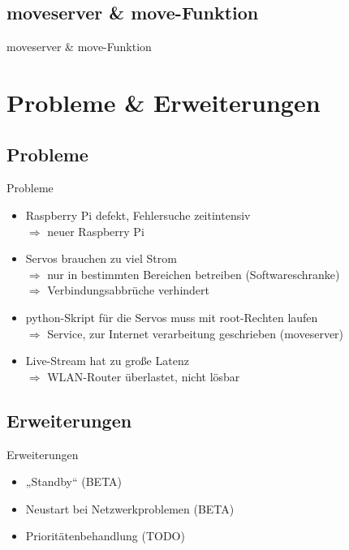 \documentclass{beamer}
\begin{document}
\subsection{moveserver \& move-Funktion}
\begin{frame}{moveserver \& move-Funktion}
\end{frame}


\section{Probleme \& Erweiterungen}%
\subsection{Probleme}
\begin{frame}{Probleme}
\begin{itemize}
	\item<1-> Raspberry Pi defekt, Fehlersuche zeitintensiv\\
		$\Rightarrow$ neuer Raspberry Pi
	\item<2-> Servos brauchen zu viel Strom\\
		$\Rightarrow$ nur in bestimmten Bereichen betreiben (Softwareschranke)\\
		$\Rightarrow$ Verbindungsabbrüche verhindert
	\item<3-> python-Skript für die Servos muss mit root-Rechten laufen\\
		$\Rightarrow$ Service, zur Internet verarbeitung geschrieben (moveserver)
	\item<4-> Live-Stream hat zu große Latenz\\
		$\Rightarrow$ WLAN-Router überlastet, nicht lösbar
\end{itemize}
\end{frame}


\subsection{Erweiterungen}
\begin{frame}{Erweiterungen}
\begin{itemize}
	\item<1-> „Standby“ (BETA)
	\item<2-> Neustart bei Netzwerkproblemen (BETA)
	\item<3-> Prioritätenbehandlung (TODO)
\end{itemize}
\end{frame}
\end{document}
